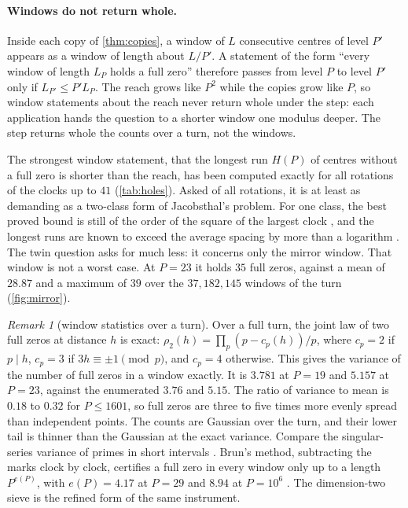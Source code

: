\documentclass[11pt]{article}
\theoremstyle{definition}\newtheorem{definition}[theorem]{Definition}
\theoremstyle{remark}\newtheorem{remark}[theorem]{Remark}
\begin{document}
\paragraph{Windows do not return whole.} Inside each copy of \cref{thm:copies}, a window of $L$ consecutive centres of level $P'$ appears as a window of length about $L/P'$. A statement of the form ``every window of length $L_P$ holds a full zero'' therefore passes from level $P$ to level $P'$ only if $L_{P'}\le P'L_P$. The reach grows like $P^2$ while the copies grow like $P$, so window statements about the reach never return whole under the step: each application hands the question to a shorter window one modulus deeper. The step returns whole the counts over a turn, not the windows.

The strongest window statement, that the longest run $H(P)$ of centres without a full zero is shorter than the reach, has been computed exactly for all rotations of the clocks up to $41$ (\cref{tab:holes}). Asked of all rotations, it is at least as demanding as a two-class form of Jacobsthal's problem. For one class, the best proved bound is still of the order of the square of the largest clock \cite{Iwaniec78}, and the longest runs are known to exceed the average spacing by more than a logarithm \cite{FGKMT}. The twin question asks for much less: it concerns only the mirror window. That window is not a worst case. At $P=23$ it holds $35$ full zeros, against a mean of $28.87$ and a maximum of $39$ over the $37{,}182{,}145$ windows of the turn (\cref{fig:mirror}).

\begin{remark}[window statistics over a turn]\label{rem:variance}
Over a full turn, the joint law of two full zeros at distance $h$ is exact: $\rho_2(h)=\prod_p(p-c_p(h))/p$, where $c_p=2$ if $p\mid h$, $c_p=3$ if $3h\equiv\pm1\pmod p$, and $c_p=4$ otherwise. This gives the variance of the number of full zeros in a window exactly. It is $3.781$ at $P=19$ and $5.157$ at $P=23$, against the enumerated $3.76$ and $5.15$. The ratio of variance to mean is $0.18$ to $0.32$ for $P\le1601$, so full zeros are three to five times more evenly spread than independent points. The counts are Gaussian over the turn, and their lower tail is thinner than the Gaussian at the exact variance. Compare the singular-series variance of primes in short intervals \cite{Gallagher76,MS04}. Brun's method, subtracting the marks clock by clock, certifies a full zero in every window only up to a length $P^{e(P)}$, with $e(P)=4.17$ at $P=29$ and $8.94$ at $P=10^6$ \cite{Brun19}. The dimension-two sieve \cite{DH08} is the refined form of the same instrument.
\end{remark}
\end{document}
